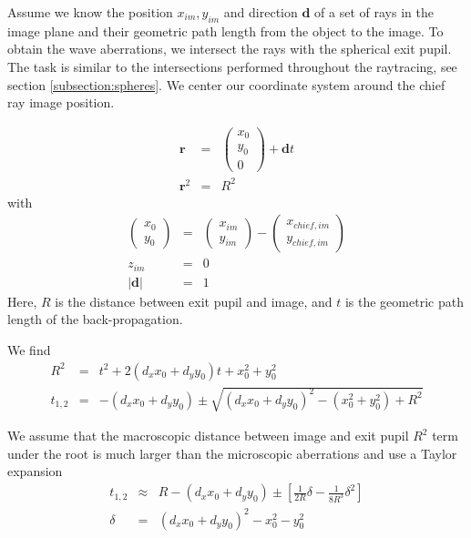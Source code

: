 \documentclass[12pt,a4paper,twoside,openright,BCOR10mm,headsepline,titlepage,abstracton,chapterprefix,final]{scrreprt}
\newcommand\Vector[1]{{\mathbf{#1}}}
\newcommand\Location{\Vector{r}}
\begin{document}
Assume we know the position $x_{im}, y_{im}$ and direction $\Vector{d}$ of a set of rays in the image plane and their geometric path length from the object to the image.
To obtain the wave aberrations, we intersect the rays with the spherical exit pupil.
The task is similar to the intersections performed throughout the raytracing, see section \ref{subsection:spheres}.
We center our coordinate system around the chief ray image position.

\begin{eqnarray}
 \Location &=& \begin{pmatrix} x_0 \\ y_0 \\ 0 \end{pmatrix} + \Vector{d} t \\
 \Location^2 &=& R^2
\end{eqnarray}
with
 \begin{eqnarray}
 \begin{pmatrix} x_0 \\ y_0 \end{pmatrix} &=& \begin{pmatrix} x_{im} \\ y_{im} \end{pmatrix} - \begin{pmatrix} x_{chief,im} \\ y_{chief,im} \end{pmatrix} \\
 z_{im} &=& 0 \\
 | \Vector{d} | &=& 1
\end{eqnarray}
Here, $R$ is the distance between exit pupil and image, and $t$ is the geometric path length of the back-propagation.

We find
\begin{eqnarray}
 R^2 &=&  t^2 + 2 (d_x x_0 + d_y y_0) t + x_0^2 + y_0^2 \\
 t_{1,2} &=& - (d_x x_0 + d_y y_0) \pm \sqrt{ (d_x x_0 + d_y y_0)^2 - (x_0^2 + y_0^2) + R^2 }
\end{eqnarray}

We assume that the macroscopic distance between image and exit pupil $R^2$ term under the root is much larger than the microscopic aberrations and use a Taylor expansion
\begin{eqnarray}
 t_{1,2} &\approx& R - (d_x x_0 + d_y y_0) \pm 
 \left[ 
   \frac{1}{2R} \delta - \frac{1}{8R^3} \delta^2
 \right]
 \\
 \delta &=& (d_x x_0 + d_y y_0)^2 - x_0^2 - y_0^2
\end{eqnarray}
\end{document}
